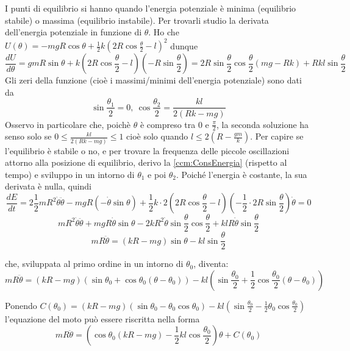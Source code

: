 \documentclass[../main.tex]{subfiles}
\begin{document}
I punti di equilibrio si hanno quando l'energia potenziale è minima (equilibrio stabile) o massima (equilibrio instabile). Per trovarli studio la derivata dell'energia potenziale in funzione di $\theta$. Ho che $U(\theta) =  - mgR\cos\theta + \frac{1}{2}k\left ( 2R\cos\frac{\theta}{2} - l\right ) ^2$ dunque
\begin{equation*}
	\frac{dU}{d\theta} = gmR\sin\theta + k\left ( 2R\cos\frac{\theta}{2} - l\right )\left (-R\sin\frac{\theta}{2}\right ) = 2R\sin\frac{\theta}{2}\cos\frac{\theta}{2} \left (mg - Rk \right ) + Rkl\sin\frac{\theta}{2}
\end{equation*}
Gli zeri della funzione (cioè i massimi/minimi dell'energia potenziale) sono dati da $$\sin\frac{\theta_1}{2} = 0,\  \cos\frac{\theta_2}{2}=\frac{kl}{2\left ( Rk - mg\right )}$$
Osservo in particolare che, poichè $\theta$ è compreso tra $0$ e $\frac{\pi}{2}$, la seconda soluzione ha senso solo se $0 \le \frac{kl}{2\left ( Rk - mg\right )} \le 1$ cioè solo quando $l\le2\left ( R - \frac{gm}{k}\right )$.
Per capire se l'equilibrio è stabile o no, e per trovare la frequenza delle piccole oscillazioni attorno alla posizione di equilibrio, derivo la \cref{ccm:ConsEnergia} (rispetto al tempo) e sviluppo in un intorno di $\theta_1$ e poi $\theta_2$. Poiché l'energia è costante, la sua derivata è nulla, quindi 
$$\frac{dE}{dt}=2 \frac{1}{2}mR^2\dot\theta\ddot\theta-mgR\left (-\dot\theta\sin\theta\right ) + \frac{1}{2}k\cdot 2\left (2R\cos\frac{\theta}{2}-l\right ) \left ( -\frac{1}{2}\cdot 2R\sin\frac{\theta}{2}\right )\dot\theta = 0$$
$$mR^2\dot\theta\ddot\theta+mgR\dot\theta\sin\theta-2kR^2\dot\theta\sin\frac{\theta}{2}\cos\frac{\theta}{2}+klR\dot\theta\sin\frac{\theta}{2}$$
\begin{equation}\label{ccm:EqMotoGiusta}
	mR\ddot\theta = \left ( kR - mg \right )\sin\theta - kl\sin\frac{\theta}{2}
\end{equation}

che, sviluppata al primo ordine in un intorno di $\theta_0$, diventa:
\begin{equation}
	mR\ddot\theta = \left ( kR - mg \right ) \left ( \sin\theta_0 + \cos\theta_0\left ( \theta - \theta_0 \right ) \right ) - kl \left ( \sin\frac{\theta_0}{2} + \frac{1}{2}\cos\frac{\theta_0}{2}\left ( \theta - \theta_0 \right ) \right )
\end{equation}

Ponendo $C(\theta_0) = \left ( kR - mg \right ) \left ( \sin\theta_0 - \theta_0\cos\theta_0\right ) - kl\left (\sin\frac{\theta_0}{2} - \frac{1}{2}\theta_0\cos\frac{\theta_0}{2}\right )$ l'equazione del moto può essere riscritta nella forma
\begin{equation}\label{ccm:EqApprossimata}
	mR\ddot\theta = \left ( \cos\theta_0\left (kR-mg\right ) -\frac{1}{2}kl\cos\frac{\theta_0}{2}\right ) \theta + C(\theta_0)
\end{equation}
\end{document}
